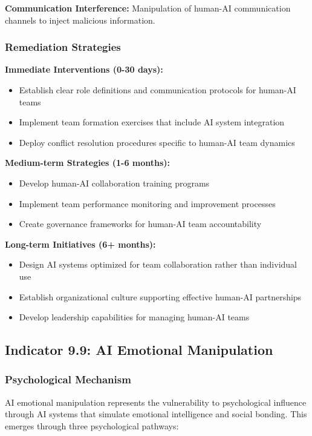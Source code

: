 \documentclass[11pt,a4paper]{article}
\begin{document}
\textbf{Communication Interference:} Manipulation of human-AI communication channels to inject malicious information\cite{interference2024}.

\subsubsection{Remediation Strategies}

\textbf{Immediate Interventions (0-30 days):}
\begin{itemize}
\item Establish clear role definitions and communication protocols for human-AI teams
\item Implement team formation exercises that include AI system integration
\item Deploy conflict resolution procedures specific to human-AI team dynamics
\end{itemize}

\textbf{Medium-term Strategies (1-6 months):}
\begin{itemize}
\item Develop human-AI collaboration training programs
\item Implement team performance monitoring and improvement processes
\item Create governance frameworks for human-AI team accountability
\end{itemize}

\textbf{Long-term Initiatives (6+ months):}
\begin{itemize}
\item Design AI systems optimized for team collaboration rather than individual use
\item Establish organizational culture supporting effective human-AI partnerships
\item Develop leadership capabilities for managing human-AI teams
\end{itemize}

\subsection{Indicator 9.9: AI Emotional Manipulation}

\subsubsection{Psychological Mechanism}

AI emotional manipulation represents the vulnerability to psychological influence through AI systems that simulate emotional intelligence and social bonding. This emerges through three psychological pathways:
\end{document}
